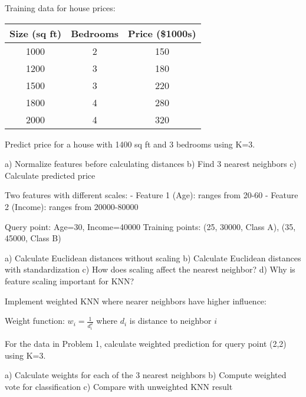 \documentclass{article}
\newcounter{exercise}
\begin{document}
\begin{tcolorbox}[colback=gray!5!white,colframe=gray!75!black,title=Problem \stepcounter{exercise}: KNN Regression]

Training data for house prices:
\begin{center}
\begin{tabular}{|c|c|c|}
\hline
Size (sq ft) & Bedrooms & Price (\$1000s) \\
\hline
1000 & 2 & 150 \\
1200 & 3 & 180 \\
1500 & 3 & 220 \\
1800 & 4 & 280 \\
2000 & 4 & 320 \\
\hline
\end{tabular}
\end{center}

Predict price for a house with 1400 sq ft and 3 bedrooms using K=3.

a) Normalize features before calculating distances
b) Find 3 nearest neighbors
c) Calculate predicted price
\end{tcolorbox}

\begin{tcolorbox}[colback=gray!5!white,colframe=gray!75!black,title=Problem \stepcounter{exercise}: Feature Scaling Impact]

Two features with different scales:
- Feature 1 (Age): ranges from 20-60
- Feature 2 (Income): ranges from 20000-80000

Query point: Age=30, Income=40000
Training points: (25, 30000, Class A), (35, 45000, Class B)

a) Calculate Euclidean distances without scaling
b) Calculate Euclidean distances with standardization
c) How does scaling affect the nearest neighbor?
d) Why is feature scaling important for KNN?
\end{tcolorbox}

\begin{tcolorbox}[colback=gray!5!white,colframe=gray!75!black,title=Problem \stepcounter{exercise}: Weighted KNN]

Implement weighted KNN where nearer neighbors have higher influence:

Weight function: $w_i = \frac{1}{d_i^2}$ where $d_i$ is distance to neighbor $i$

For the data in Problem 1, calculate weighted prediction for query point (2,2) using K=3.

a) Calculate weights for each of the 3 nearest neighbors
b) Compute weighted vote for classification
c) Compare with unweighted KNN result
\end{tcolorbox}
\end{document}
